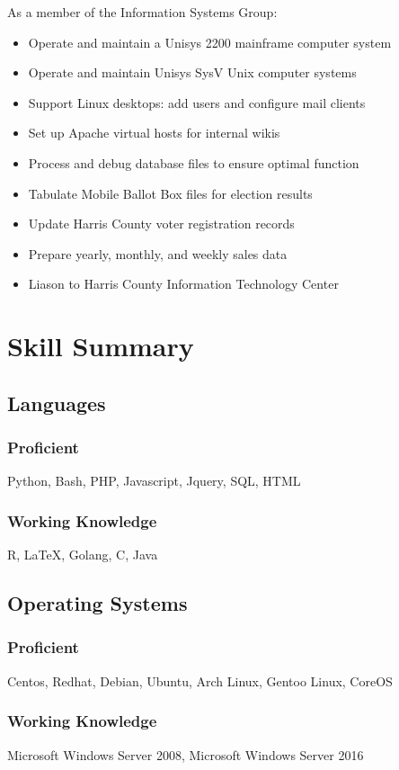 \documentclass{article}
\begin{document}
  As a member of the Information Systems Group:\\
  \begin{itemize}
  \item Operate and maintain a Unisys 2200 mainframe computer system
  \item Operate and maintain Unisys SysV Unix computer systems
  \item Support Linux desktops: add users and configure mail clients
  \item Set up Apache virtual hosts for internal wikis
  \item Process and debug database files to ensure optimal function
  \item Tabulate Mobile Ballot Box files for election results
  \item Update Harris County voter registration records
  \item Prepare yearly, monthly, and weekly sales data
  \item Liason to Harris County Information Technology Center
  \end{itemize}

\section{Skill Summary}
  \subsection{Languages}
    \subsubsection{Proficient}
    Python, Bash, PHP, Javascript, Jquery, SQL, HTML
    \subsubsection{Working Knowledge}
    R, {\LaTeX}, Golang, C, Java

  \subsection{Operating Systems}
    \subsubsection{Proficient}
    Centos, Redhat, Debian, Ubuntu, Arch Linux, Gentoo Linux, CoreOS
    \subsubsection{Working Knowledge}
    Microsoft Windows Server 2008, Microsoft Windows Server 2016
\end{document}

